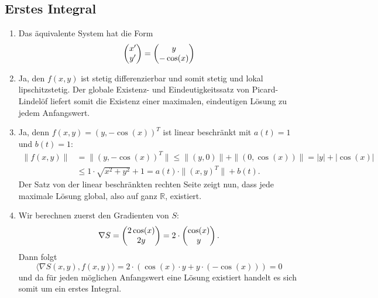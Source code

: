 \documentclass[a4paper]{article}
\begin{document}
\makeexheaderger

\subsection{Erstes Integral}

\begin{enumerate}[label=(\alph*)]
    \item Das äquivalente System hat die Form
    \begin{equation*}
        \left(\begin{matrix}x' \\ y'\end{matrix}\right) = \left(\begin{matrix}y \\ -\cos(x)\end{matrix}\right)
    \end{equation*}
    \item Ja, den $f(x,y)$ ist stetig differenzierbar und somit stetig und lokal lipschitzstetig. Der globale Existenz- und Eindeutigkeitssatz von Picard-Lindelöf liefert somit die Existenz einer maximalen, eindeutigen Lösung zu jedem Anfangswert.
    \item Ja, denn $f(x,y) = (y, -\cos(x))^T$ ist linear beschränkt mit $a(t) = 1$ und $b(t) = 1$:
    \begin{align*}
        \|f(x,y)\| &= \|(y, -\cos(x))^T\| \leq \| (y,0) \| + \|(0, \cos(x))\| = |y| + |\cos(x)|\\ &\leq 1 \cdot \sqrt{x^2 + y^2} + 1 = a(t) \cdot \|(x,y)^T\| + b(t)\text{.}
    \end{align*}
    Der Satz von der linear beschränkten rechten Seite zeigt nun, dass jede maximale Lösung global, also auf ganz $\mathds{R}$, existiert.
    \item Wir berechnen zuerst den Gradienten von $S$:
    \begin{equation*}
        \nabla S = \left(\begin{matrix}2 \cos (x) \\ 2 y\end{matrix}\right) = 2 \cdot \left(\begin{matrix}\cos(x) \\ y\end{matrix}\right)\text{.}
    \end{equation*}
    Dann folgt
    \begin{equation*}
        \langle \nabla S(x,y), f(x,y) \rangle = 2 \cdot (\cos(x) \cdot y + y \cdot (-\cos(x))) = 0
    \end{equation*}
    und da für jeden möglichen Anfangswert eine Lösung existiert handelt es sich somit um ein erstes Integral.
\end{enumerate}
\end{document}
